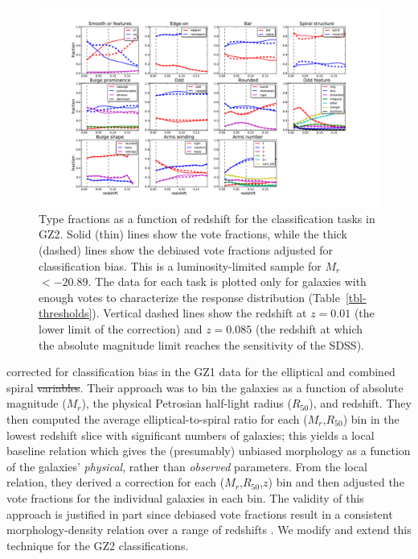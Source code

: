 \documentclass[useAMS,usenatbib]{mn2e}
\newcommand{\mr}{$M_r$}
\newcommand{\rfifty}{$R_{50}$}
\providecommand{\DIFaddtex}[1]{{\protect\color{blue}\uwave{#1}}} %
\providecommand{\DIFdeltex}[1]{{\protect\color{red}\sout{#1}}}                      %
\providecommand{\DIFaddbegin}{} %
\providecommand{\DIFaddend}{} %
\providecommand{\DIFdelbegin}{} %
\providecommand{\DIFdelend}{} %
\providecommand{\DIFadd}[1]{\texorpdfstring{\DIFaddtex{#1}}{#1}} %
\providecommand{\DIFdel}[1]{\texorpdfstring{\DIFdeltex{#1}}{}} %
\begin{document}
\begin{figure}
\includegraphics[angle=0,width=7.0in]{figures/gz2_type_fractions.pdf}
\caption{Type fractions as a function of redshift for the classification tasks in GZ2. Solid (thin) lines show the vote fractions, while the thick (dashed) lines show the debiased vote fractions adjusted for classification bias. This is a luminosity-limited sample for \mr~$<-20.89$. The data for each task is plotted only for galaxies with enough votes to characterize the response distribution (Table~\ref{tbl-thresholds}). Vertical dashed lines show the redshift at $z=0.01$ (the lower limit of the correction) and $z=0.085$ (the redshift at which the absolute magnitude limit reaches the sensitivity of the SDSS). 
\label{fig-type_fractions}}
\end{figure}

\citet{bam09} corrected for classification bias in the GZ1 data for the elliptical and combined spiral \DIFdelbegin \DIFdel{variables}\DIFdelend \DIFaddbegin \DIFadd{classes}\DIFaddend . Their approach was to bin the galaxies as a function of absolute magnitude (\mr), the physical Petrosian half-light radius (\rfifty), and redshift. They then computed the average elliptical-to-spiral ratio for each (\mr,\rfifty) bin in the lowest redshift slice with significant numbers of galaxies; this yields a local baseline relation which gives the (presumably) unbiased morphology as a function of the galaxies' {\em physical}, rather than {\em observed} parameters. From the local relation, they derived a correction for each (\mr,\rfifty,$z$) bin and then adjusted the vote fractions for the individual galaxies in each bin. The validity of this approach is justified in part since debiased vote fractions result in a consistent morphology-density relation over a range of redshifts \citep{bam09}. We modify and extend this technique for the GZ2 classifications. 
\end{document}
